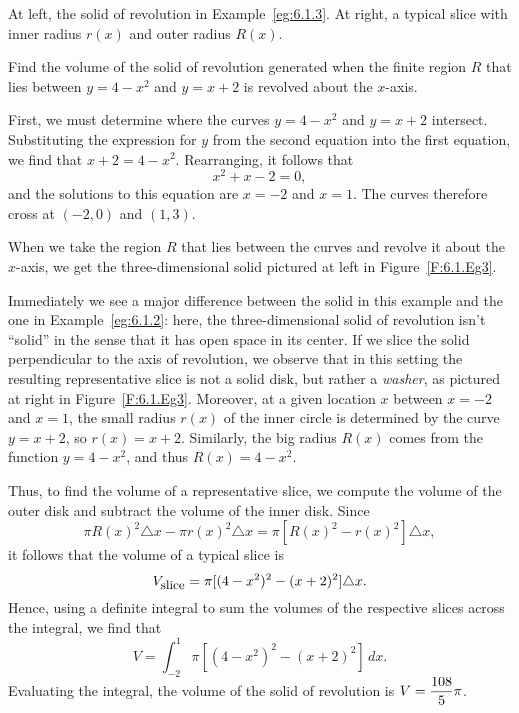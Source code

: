\begin{marginfigure}[2cm] %
\caption{At left, the solid of revolution in Example~\ref{eg:6.1.3}.  At right, a typical slice with inner radius $r(x)$ and outer radius $R(x)$.} \label{F:6.1.Eg3}
\end{marginfigure}

\begin{example} \label{eg:6.1.3} %
Find the volume of the solid of revolution generated when the finite region $R$ that lies between $y = 4-x^2$ and $y = x+2$ is revolved about the $x$-axis.


\solution
First, we must determine where the curves $y = 4-x^2$ and $y = x+2$ intersect.  Substituting the expression for $y$ from the second equation into the first equation, we find that $x + 2 = 4-x^2$.  Rearranging, it follows that
$$x^2 + x - 2 = 0,$$
and the solutions to this equation are $x = -2$ and $x = 1$.  The curves therefore cross at $(-2,0)$ and $(1,3)$.

When we take the region $R$  that lies between the curves and revolve it about the $x$-axis, we get the three-dimensional solid pictured at left in Figure~\ref{F:6.1.Eg3}.

Immediately we see a major difference between the solid in this example and the one in Example~\ref{eg:6.1.2}:  here, the three-dimensional solid of revolution isn't ``solid'' in the sense that it has open space in its center.  If we slice the solid perpendicular to the axis of revolution, we observe that in this setting the resulting representative slice is not a solid disk, but rather a \emph{washer}, as pictured at right in Figure~\ref{F:6.1.Eg3}.  Moreover, at a given location $x$ between $x = -2$ and $x = 1$, the small radius $r(x)$ of the inner circle is determined by the curve $y = x+2$, so $r(x) = x+2$.  Similarly, the big radius $R(x)$ comes from the function $y = 4-x^2$, and thus $R(x) = 4-x^2$.

Thus, to find the volume of a representative slice, we compute the volume of the outer disk and subtract the volume of the inner disk.  Since
$$\pi R(x)^2 \triangle x - \pi r(x)^2 \triangle x = \pi [ R(x)^2 - r(x)^2] \triangle x,$$
it follows that the volume of a typical slice is
$$V_{\text{\small{slice}}} = \pi [ (4-x^2)^2 - (x+2)^2 ] \triangle x.$$
Hence, using a definite integral to sum the volumes of the respective slices across the integral, we find that
$$V = \int_{-2}^1 \pi[ (4-x^2)^2 - (x+2)^2 ] \, dx.$$
Evaluating the integral, the volume of the solid of revolution is $\displaystyle V = \frac{108}{5}\pi$.
\end{example}